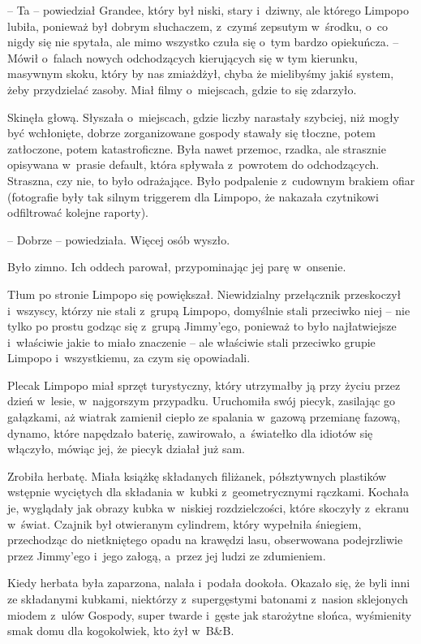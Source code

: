 \documentclass[oneside,polish,11pt,sfheadings]{mwbk}
\begin{document}
-- Ta -- powiedział Grandee, który był niski, stary i~dziwny, ale którego
Limpopo lubiła, ponieważ był dobrym słuchaczem, z~czymś zepsutym w~środku, o~co nigdy się nie spytała, ale mimo wszystko czuła się o~tym
bardzo opiekuńcza. -- Mówił o~falach nowych odchodzących kierujących się
w tym kierunku, masywnym skoku, który by nas zmiażdżył, chyba że
mielibyśmy jakiś system, żeby przydzielać zasoby. Miał filmy o~miejscach, gdzie to się zdarzyło.

Skinęła głową. Słyszała o~miejscach, gdzie liczby narastały szybciej,
niż mogły być wchłonięte, dobrze zorganizowane gospody stawały się
tłoczne, potem zatłoczone, potem katastroficzne. Była nawet przemoc,
rzadka, ale strasznie opisywana w~prasie default, która spływała z~powrotem do odchodzących. Straszna, czy nie, to było odrażające. Było
podpalenie z~cudownym brakiem ofiar (fotografie były tak silnym
triggerem dla Limpopo, że nakazała czytnikowi odfiltrować kolejne
raporty).

-- Dobrze -- powiedziała. Więcej osób wyszło.

Było zimno. Ich oddech parował, przypominając jej parę w~onsenie.

Tłum po stronie Limpopo się powiększał. Niewidzialny przełącznik
przeskoczył i~wszyscy, którzy nie stali z~grupą Limpopo, domyślnie stali
przeciwko niej -- nie tylko po prostu godząc się z~grupą Jimmy'ego,
ponieważ to było najłatwiejsze i~właściwie jakie to miało znaczenie -- ale właściwie stali przeciwko grupie Limpopo i~wszystkiemu, za czym się
opowiadali.

Plecak Limpopo miał sprzęt turystyczny, który utrzymałby ją przy życiu
przez dzień w~lesie, w~najgorszym przypadku. Uruchomiła swój piecyk,
zasilając go gałązkami, aż wiatrak zamienił ciepło ze spalania w~gazową
przemianę fazową, dynamo, które napędzało baterię, zawirowało, a~światełko dla idiotów się włączyło, mówiąc jej, że piecyk działał już
sam.

Zrobiła herbatę. Miała książkę składanych filiżanek, półsztywnych
plastików wstępnie wyciętych dla składania w~kubki z~geometrycznymi
rączkami. Kochała je, wyglądały jak obrazy kubka w~niskiej
rozdzielczości, które skoczyły z~ekranu w~świat. Czajnik był otwieranym
cylindrem, który wypełniła śniegiem, przechodząc do nietkniętego opadu
na krawędzi lasu, obserwowana podejrzliwie przez Jimmy'ego i~jego
załogą, a~przez jej ludzi ze zdumieniem.

Kiedy herbata była zaparzona, nalała i~podała dookoła. Okazało się, że
byli inni ze składanymi kubkami, niektórzy z~supergęstymi batonami z~nasion sklejonych miodem z~ulów Gospody, super twarde i~gęste jak
starożytne słońca, wyśmienity smak domu dla kogokolwiek, kto żył w~B\&B.
\end{document}
